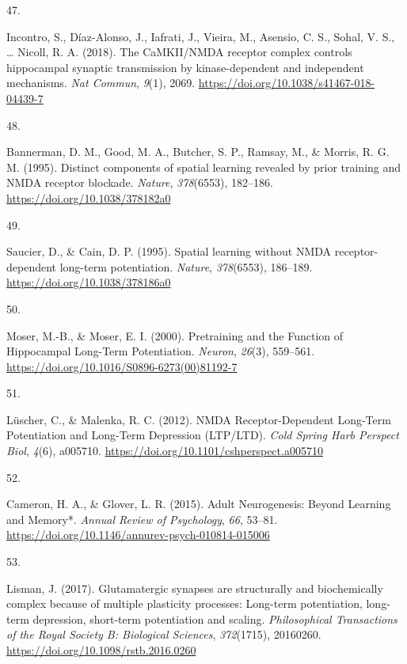 \documentclass[
  11pt,
  letterpaper,
]{scrreprt}
\newlength{\cslhangindent}
\newlength{\csllabelwidth}
\newenvironment{CSLReferences}[2] %
 {\begin{list}{}{%
  \setlength{\itemindent}{0pt}
  \setlength{\leftmargin}{0pt}
  \setlength{\parsep}{0pt}
  \ifodd #1
   \setlength{\leftmargin}{\cslhangindent}
   \setlength{\itemindent}{-1\cslhangindent}
  \fi
  \setlength{\itemsep}{#2\baselineskip}}}
 {\end{list}}
\newcommand{\CSLLeftMargin}[1]{\parbox[t]{\csllabelwidth}{\strut#1\strut}}
\newcommand{\CSLRightInline}[1]{\parbox[t]{\linewidth - \csllabelwidth}{\strut#1\strut}}
\begin{document}
\begin{CSLReferences}{0}{0}
\CSLLeftMargin{47. }%
\CSLRightInline{Incontro, S., Díaz-Alonso, J., Iafrati, J., Vieira, M.,
Asensio, C. S., Sohal, V. S., \ldots{} Nicoll, R. A. (2018). The
{CaMKII}/{NMDA} receptor complex controls hippocampal synaptic
transmission by kinase-dependent and independent mechanisms. \emph{Nat
Commun}, \emph{9}(1), 2069.
\url{https://doi.org/10.1038/s41467-018-04439-7}}

\CSLLeftMargin{48. }%
\CSLRightInline{Bannerman, D. M., Good, M. A., Butcher, S. P., Ramsay,
M., \& Morris, R. G. M. (1995). Distinct components of spatial learning
revealed by prior training and {NMDA} receptor blockade. \emph{Nature},
\emph{378}(6553), 182--186. \url{https://doi.org/10.1038/378182a0}}

\CSLLeftMargin{49. }%
\CSLRightInline{Saucier, D., \& Cain, D. P. (1995). Spatial learning
without {NMDA} receptor-dependent long-term potentiation. \emph{Nature},
\emph{378}(6553), 186--189. \url{https://doi.org/10.1038/378186a0}}

\CSLLeftMargin{50. }%
\CSLRightInline{Moser, M.-B., \& Moser, E. I. (2000). Pretraining and
the {Function} of {Hippocampal Long-Term Potentiation}. \emph{Neuron},
\emph{26}(3), 559--561.
\url{https://doi.org/10.1016/S0896-6273(00)81192-7}}

\CSLLeftMargin{51. }%
\CSLRightInline{Lüscher, C., \& Malenka, R. C. (2012). {NMDA
Receptor-Dependent Long-Term Potentiation} and {Long-Term Depression}
({LTP}/{LTD}). \emph{Cold Spring Harb Perspect Biol}, \emph{4}(6),
a005710. \url{https://doi.org/10.1101/cshperspect.a005710}}

\CSLLeftMargin{52. }%
\CSLRightInline{Cameron, H. A., \& Glover, L. R. (2015). Adult
{Neurogenesis}: {Beyond Learning} and {Memory}*. \emph{Annual Review of
Psychology}, \emph{66}, 53--81.
\url{https://doi.org/10.1146/annurev-psych-010814-015006}}

\CSLLeftMargin{53. }%
\CSLRightInline{Lisman, J. (2017). Glutamatergic synapses are
structurally and biochemically complex because of multiple plasticity
processes: Long-term potentiation, long-term depression, short-term
potentiation and scaling. \emph{Philosophical Transactions of the Royal
Society B: Biological Sciences}, \emph{372}(1715), 20160260.
\url{https://doi.org/10.1098/rstb.2016.0260}}


\end{CSLReferences}
\end{document}
